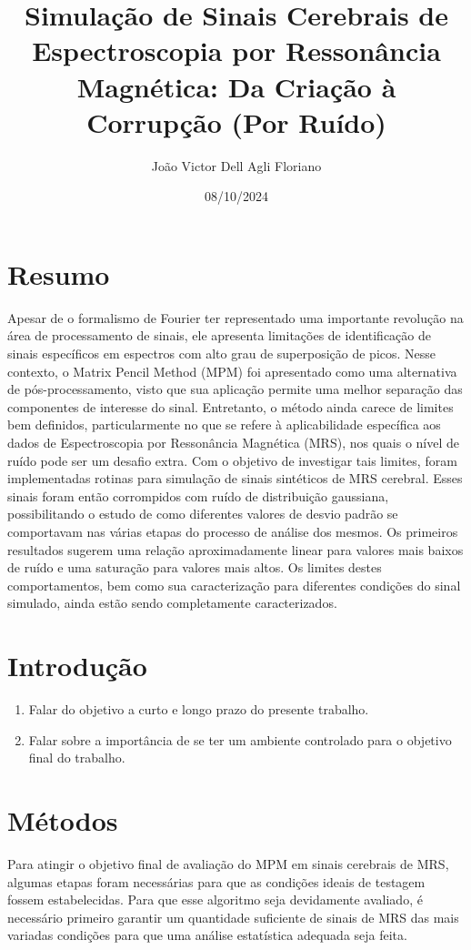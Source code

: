 \documentclass{article}
\title{ Simulação de Sinais Cerebrais de Espectroscopia por 
Ressonância Magnética: Da Criação à Corrupção (Por Ruído)}
\author{João Victor Dell Agli Floriano}
\date{08/10/2024}
\begin{document}
\maketitle

\section{Resumo}
Apesar de o formalismo de Fourier ter representado uma importante revolução na área de processamento 
de sinais, ele apresenta limitações de identificação de sinais específicos em espectros com alto grau 
de superposição de picos. Nesse contexto, o Matrix Pencil Method (MPM) foi apresentado como uma 
alternativa de pós-processamento, visto que sua aplicação permite uma melhor separação das componentes 
de interesse do sinal.  Entretanto, o método ainda carece de limites bem definidos, particularmente no 
que se refere à aplicabilidade específica aos dados de Espectroscopia por Ressonância Magnética (MRS), 
nos quais o nível de ruído pode ser um desafio extra. Com o objetivo de investigar tais limites, foram 
implementadas rotinas para simulação de sinais sintéticos de MRS cerebral. Esses sinais foram então 
corrompidos com ruído de distribuição gaussiana, possibilitando o estudo de como diferentes valores de 
desvio padrão se comportavam nas várias etapas do processo de análise dos mesmos. Os primeiros resultados 
sugerem uma relação aproximadamente linear para valores mais baixos de ruído e uma saturação para valores 
mais altos. Os limites destes comportamentos, bem como sua caracterização para diferentes condições do sinal 
simulado, ainda estão sendo completamente caracterizados.
\section{Introdução}

\begin{enumerate}
    \item Falar do objetivo a curto e longo prazo do presente trabalho.
    \item Falar sobre a importância de se ter um ambiente controlado para o objetivo final do trabalho. 
\end{enumerate}

\section{Métodos}

Para atingir o objetivo final de avaliação do MPM em sinais cerebrais de MRS, algumas etapas foram 
necessárias para que as condições ideais de testagem fossem estabelecidas. Para que esse algoritmo 
seja devidamente avaliado, é necessário primeiro garantir um quantidade suficiente de sinais de 
MRS das mais variadas condições para que uma análise estatística adequada seja feita. 
\end{document}
